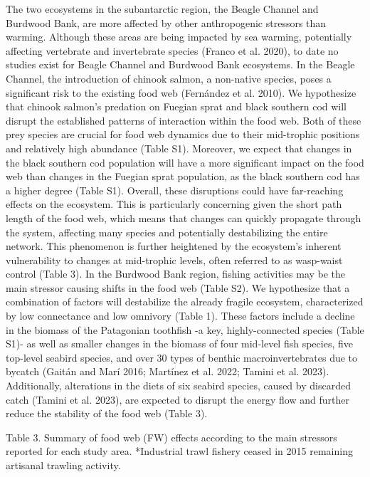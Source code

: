 \documentclass[
]{article}
\begin{document}
The two ecosystems in the subantarctic region, the Beagle Channel and
Burdwood Bank, are more affected by other anthropogenic stressors than
warming. Although these areas are being impacted by sea warming,
potentially affecting vertebrate and invertebrate species (Franco et al.
2020), to date no studies exist for Beagle Channel and Burdwood Bank
ecosystems. In the Beagle Channel, the introduction of chinook salmon, a
non-native species, poses a significant risk to the existing food web
(Fernández et al. 2010). We hypothesize that chinook salmon's predation
on Fuegian sprat and black southern cod will disrupt the established
patterns of interaction within the food web. Both of these prey species
are crucial for food web dynamics due to their mid-trophic positions and
relatively high abundance (Table S1). Moreover, we expect that changes
in the black southern cod population will have a more significant impact
on the food web than changes in the Fuegian sprat population, as the
black southern cod has a higher degree (Table S1). Overall, these
disruptions could have far-reaching effects on the ecosystem. This is
particularly concerning given the short path length of the food web,
which means that changes can quickly propagate through the system,
affecting many species and potentially destabilizing the entire network.
This phenomenon is further heightened by the ecosystem's inherent
vulnerability to changes at mid-trophic levels, often referred to as
wasp-waist control (Table 3). In the Burdwood Bank region, fishing
activities may be the main stressor causing shifts in the food web
(Table S2). We hypothesize that a combination of factors will
destabilize the already fragile ecosystem, characterized by low
connectance and low omnivory (Table 1). These factors include a decline
in the biomass of the Patagonian toothfish -a key, highly-connected
species (Table S1)- as well as smaller changes in the biomass of four
mid-level fish species, five top-level seabird species, and over 30
types of benthic macroinvertebrates due to bycatch (Gaitán and Marí
2016; Martínez et al. 2022; Tamini et al. 2023). Additionally,
alterations in the diets of six seabird species, caused by discarded
catch (Tamini et al. 2023), are expected to disrupt the energy flow and
further reduce the stability of the food web (Table 3).

\scriptsize

Table 3. Summary of food web (FW) effects according to the main
stressors reported for each study area. *Industrial trawl fishery ceased
in 2015 remaining artisanal trawling activity.
\end{document}
